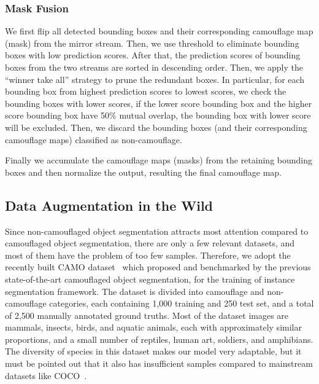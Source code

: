 \documentclass[journal]{IEEEtran}
\begin{document}
\subsubsection{Mask Fusion} 

We first flip all detected bounding boxes and their corresponding camouflage map (mask) from the mirror stream. Then, we use threshold  to eliminate bounding boxes with low prediction scores. After that, the prediction scores of bounding boxes from the two streams are sorted in descending order. Then, we apply the ``winner take all'' strategy to prune the redundant boxes. In particular, for each bounding box from highest prediction scores to lowest scores, we check the  bounding boxes with lower scores, if the lower score bounding box and the higher score bounding box have 50\% mutual overlap, the bounding box with lower score will be excluded. Then, we discard the bounding boxes (and their corresponding camouflage maps) classified as non-camouflage.  



Finally we accumulate the camouflage maps (masks) from the retaining bounding boxes and then normalize the output, resulting the final camouflage map.



















\subsection{Data Augmentation in the Wild}



Since non-camouflaged object segmentation attracts most attention compared to camouflaged object segmentation, there are only a few relevant datasets, and most of them have the problem of too few samples. Therefore, we adopt the recently built CAMO dataset~\cite{CAMO} which proposed and benchmarked by the previous state-of-the-art camouflaged object segmentation, for the training of instance segmentation framework. The dataset is divided into camouflage and non-camouflage categories, each containing 1,000 training and 250 test set, and a total of 2,500 manually annotated ground truths. Most of the dataset images are mammals, insects, birds, and aquatic animals, each with approximately similar proportions, and a small number of reptiles, human art, soldiers, and amphibians. The diversity of species in this dataset makes our model very adaptable, but it must be pointed out that it also has insufficient samples compared to mainstream datasets like COCO~\cite{Lin-ECCV2014}. 
\end{document}

